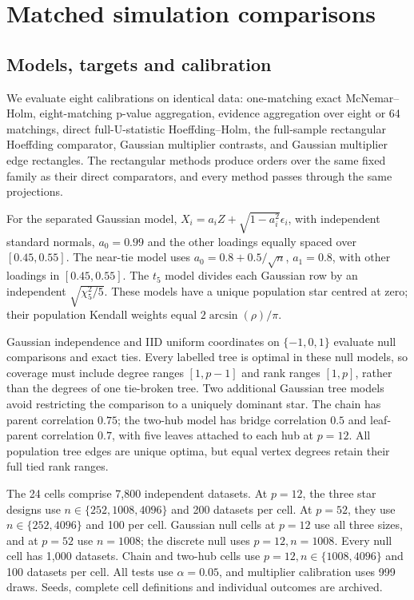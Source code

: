 \section{Matched simulation comparisons}\label{sec:simulation}
\subsection{Models, targets and calibration}
We evaluate eight calibrations on identical data: one-matching exact McNemar--Holm, eight-matching p-value aggregation, evidence aggregation over eight or 64 matchings, direct full-U-statistic Hoeffding--Holm, the full-sample rectangular Hoeffding comparator, Gaussian multiplier contrasts, and Gaussian multiplier edge rectangles. The rectangular methods produce orders over the same fixed family as their direct comparators, and every method passes through the same projections.

For the separated Gaussian model, $X_i=a_i Z+\sqrt{1-a_i^2}\epsilon_i$, with independent standard normals, $a_0=0.99$ and the other loadings equally spaced over $[0.45,0.55]$. The near-tie model uses $a_0=0.8+0.5/\sqrt n$, $a_1=0.8$, with other loadings in $[0.45,0.55]$. The $t_5$ model divides each Gaussian row by an independent $\sqrt{\chi_5^2/5}$. These models have a unique population star centred at zero; their population Kendall weights equal $2\arcsin(\rho)/\pi$.

Gaussian independence and IID uniform coordinates on $\{-1,0,1\}$ evaluate null comparisons and exact ties. Every labelled tree is optimal in these null models, so coverage must include degree ranges $[1,p-1]$ and rank ranges $[1,p]$, rather than the degrees of one tie-broken tree. Two additional Gaussian tree models avoid restricting the comparison to a uniquely dominant star. The chain has parent correlation $0.75$; the two-hub model has bridge correlation $0.5$ and leaf-parent correlation $0.7$, with five leaves attached to each hub at $p=12$. All population tree edges are unique optima, but equal vertex degrees retain their full tied rank ranges.

The 24 cells comprise 7,800 independent datasets. At $p=12$, the three star designs use $n\in\{252,1008,4096\}$ and 200 datasets per cell. At $p=52$, they use $n\in\{252,4096\}$ and 100 per cell. Gaussian null cells at $p=12$ use all three sizes, and at $p=52$ use $n=1008$; the discrete null uses $p=12,n=1008$. Every null cell has 1,000 datasets. Chain and two-hub cells use $p=12,n\in\{1008,4096\}$ and 100 datasets per cell. All tests use $\alpha=0.05$, and multiplier calibration uses 999 draws. Seeds, complete cell definitions and individual outcomes are archived.

